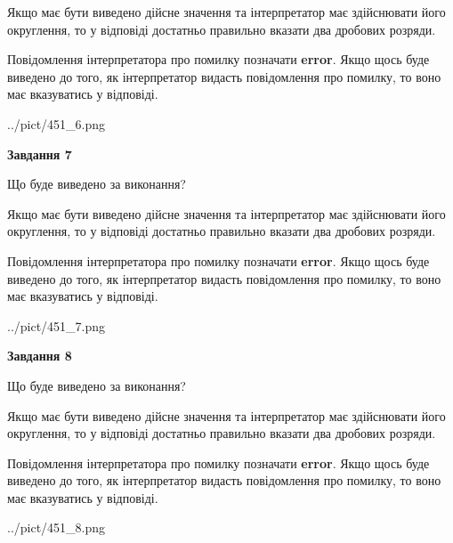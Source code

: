 \documentclass[12pt, ukrainian]{article}
\begin{document}
{\begin {Large}
Якщо має бути виведено дійсне значення та інтерпретатор має здійснювати його округлення, 
то у відповіді достатньо правильно вказати два дробових розряди.

Повідомлення інтерпретатора про помилку позначати \textbf{error}.
Якщо щось буде виведено до того, як інтерпретатор видасть повідомлення про помилку, 
то воно має вказуватись у відповіді. \par

\begin{center}
	{../pict/451_6.png}
\end{center}
\newpage

{\begin {center}\textbf{Завдання 7}\end {center}}\par
Що буде виведено за виконання? \par

Якщо має бути виведено дійсне значення та інтерпретатор має здійснювати його округлення, 
то у відповіді достатньо правильно вказати два дробових розряди.

Повідомлення інтерпретатора про помилку позначати \textbf{error}.
Якщо щось буде виведено до того, як інтерпретатор видасть повідомлення про помилку, 
то воно має вказуватись у відповіді. \par

\begin{center}
	{../pict/451_7.png}
\end{center}
\newpage

{\begin {center}\textbf{Завдання 8}\end {center}}\par
Що буде виведено за виконання? \par

Якщо має бути виведено дійсне значення та інтерпретатор має здійснювати його округлення, 
то у відповіді достатньо правильно вказати два дробових розряди.

Повідомлення інтерпретатора про помилку позначати \textbf{error}.
Якщо щось буде виведено до того, як інтерпретатор видасть повідомлення про помилку, 
то воно має вказуватись у відповіді. \par

\begin{center}
	{../pict/451_8.png}
\end{center}
\newpage


\end{Large}}
\end{document}
